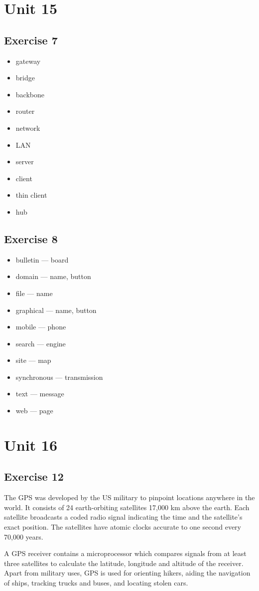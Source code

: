 \documentclass[a5paper,10pt,notitlepage,pdftex,headsepline]{scrartcl}
\begin{document}
\section{Unit 15}
  \subsection{Exercise 7}
    \begin{itemize}
      \item gateway
      \item bridge
      \item backbone
      \item router
      \item network
      \item LAN
      \item server
      \item client
      \item thin client
      \item hub
    \end{itemize}
  \subsection{Exercise 8}
    \begin{itemize}
      \item bulletin --- board
      \item domain --- name, button
      \item file --- name
      \item graphical --- name, button
      \item mobile --- phone
      \item search --- engine
      \item site --- map
      \item synchronous --- transmission
      \item text --- message
      \item web --- page
    \end{itemize}
\section{Unit 16}
  \subsection{Exercise 12}
    The GPS was developed by the US military to pinpoint locations anywhere in
    the world.
    It consists of 24 earth-orbiting satellites 17,000 km above the earth.
    Each satellite broadcasts a coded radio signal indicating the time and the
    satellite's exact position.
    The satellites have atomic clocks accurate to one second every 70,000
    years.

    A GPS receiver contains a microprocessor which compares signals from at
    least three satellites to calculate the latitude, longitude and altitude
    of the receiver.
    Apart from military uses, GPS is used for orienting hikers, aiding the
    navigation of ships, tracking trucks and buses, and locating stolen cars.
\end{document}
